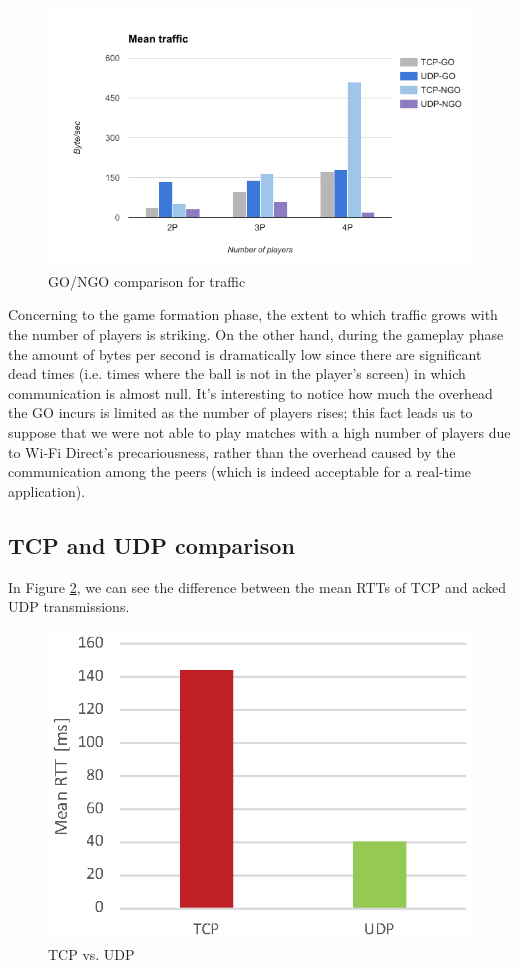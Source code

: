\begin{figure}[H]
\includegraphics[width=\columnwidth]{img/traffic.png}

\caption{GO/NGO comparison for traffic}\label{fig:traffic}
\end{figure}


Concerning to the game formation phase, the extent to which traffic grows with
the number of players is striking. On the other hand, during the gameplay phase
the amount of bytes per second is dramatically low since there are significant
dead times (i.e. times where the ball is not in the player's screen) in which
communication is almost null.
It's interesting to notice how much the overhead the GO incurs is limited as
the number of players rises; this fact leads us to suppose that we were not
able to play matches with a high number of players due to Wi-Fi Direct's
precariousness, rather than the overhead caused by the communication among the
peers (which is indeed acceptable for a real-time application).

\subsection{TCP and UDP comparison}

In Figure \ref{fig:TCP-UDP}, we can see the difference between the mean RTTs of
TCP and acked UDP transmissions.

\begin{figure}[H]
  \centering
  \includegraphics[width=.8\columnwidth]{img/UDPvsTCP-RTT.eps}
  \caption{TCP vs. UDP}
  \label{fig:TCP-UDP}
\end{figure}

